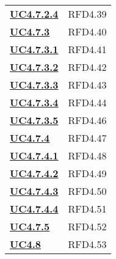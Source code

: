 \begin{longtable}[H]{| >{\centering\bfseries}p{8cm} | >{\centering\arraybackslash}p{8cm} |}
    \hyperref[spar:uc4.7.2.4]{UC4.7.2.4} & RFD4.39 \\

    \hyperref[par:uc4.7.3]{UC4.7.3} & RFD4.40 \\

    \hyperref[spar:uc4.7.3.1]{UC4.7.3.1} & RFD4.41 \\

    \hyperref[spar:uc4.7.3.2]{UC4.7.3.2} & RFD4.42 \\

    \hyperref[spar:uc4.7.3.3]{UC4.7.3.3} & RFD4.43 \\

    \hyperref[spar:uc4.7.3.4]{UC4.7.3.4} & RFD4.44 \\

    \hyperref[spar:uc4.7.3.5]{UC4.7.3.5} & RFD4.46 \\

    \hyperref[par:uc4.7.4]{UC4.7.4} & RFD4.47 \\

    \hyperref[spar:uc4.7.4.1]{UC4.7.4.1} & RFD4.48 \\

    \hyperref[spar:uc4.7.4.2]{UC4.7.4.2} & RFD4.49 \\

    \hyperref[spar:uc4.7.4.3]{UC4.7.4.3} & RFD4.50 \\

    \hyperref[spar:uc4.7.4.4]{UC4.7.4.4} & RFD4.51 \\

    \hyperref[par:uc4.7.5]{UC4.7.5} & RFD4.52 \\

    \hyperref[ssub:uc4.8]{UC4.8} & RFD4.53 \\

\end{longtable}
